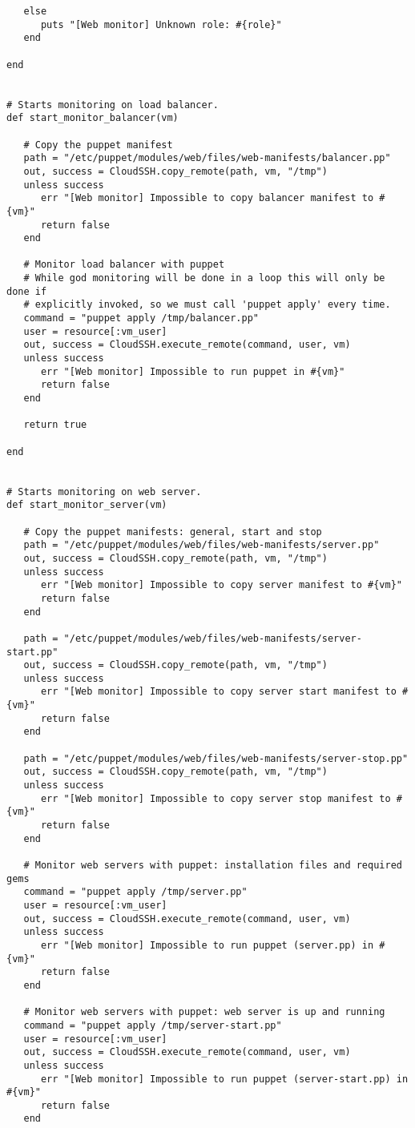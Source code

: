 \begin{lstlisting}
   else
      puts "[Web monitor] Unknown role: #{role}"
   end
   
end


# Starts monitoring on load balancer.
def start_monitor_balancer(vm)

   # Copy the puppet manifest
   path = "/etc/puppet/modules/web/files/web-manifests/balancer.pp"
   out, success = CloudSSH.copy_remote(path, vm, "/tmp")
   unless success
      err "[Web monitor] Impossible to copy balancer manifest to #{vm}"
      return false
   end

   # Monitor load balancer with puppet
   # While god monitoring will be done in a loop this will only be done if
   # explicitly invoked, so we must call 'puppet apply' every time.
   command = "puppet apply /tmp/balancer.pp"
   user = resource[:vm_user]
   out, success = CloudSSH.execute_remote(command, user, vm)
   unless success
      err "[Web monitor] Impossible to run puppet in #{vm}"
      return false
   end
   
   return true
   
end


# Starts monitoring on web server.
def start_monitor_server(vm)

   # Copy the puppet manifests: general, start and stop
   path = "/etc/puppet/modules/web/files/web-manifests/server.pp"
   out, success = CloudSSH.copy_remote(path, vm, "/tmp")
   unless success
      err "[Web monitor] Impossible to copy server manifest to #{vm}"
      return false
   end
   
   path = "/etc/puppet/modules/web/files/web-manifests/server-start.pp"
   out, success = CloudSSH.copy_remote(path, vm, "/tmp")
   unless success
      err "[Web monitor] Impossible to copy server start manifest to #{vm}"
      return false
   end
   
   path = "/etc/puppet/modules/web/files/web-manifests/server-stop.pp"
   out, success = CloudSSH.copy_remote(path, vm, "/tmp")
   unless success
      err "[Web monitor] Impossible to copy server stop manifest to #{vm}"
      return false
   end
   
   # Monitor web servers with puppet: installation files and required gems
   command = "puppet apply /tmp/server.pp"
   user = resource[:vm_user]
   out, success = CloudSSH.execute_remote(command, user, vm)
   unless success
      err "[Web monitor] Impossible to run puppet (server.pp) in #{vm}"
      return false
   end
   
   # Monitor web servers with puppet: web server is up and running
   command = "puppet apply /tmp/server-start.pp"
   user = resource[:vm_user]
   out, success = CloudSSH.execute_remote(command, user, vm)
   unless success
      err "[Web monitor] Impossible to run puppet (server-start.pp) in #{vm}"
      return false
   end
   

\end{lstlisting}
